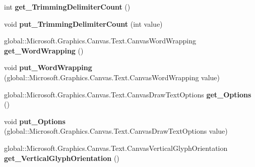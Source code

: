 \begin{DoxyCompactItemize}
int {\bfseries get\+\_\+\+Trimming\+Delimiter\+Count} ()
\item 
\mbox{\label{class_microsoft_1_1_graphics_1_1_canvas_1_1_text_1_1_canvas_text_format_a5b0a73ce4c824439d5e199f8b61aa1ea}} 
void {\bfseries put\+\_\+\+Trimming\+Delimiter\+Count} (int value)
\item 
\mbox{\label{class_microsoft_1_1_graphics_1_1_canvas_1_1_text_1_1_canvas_text_format_abb2706795b70c24892b6368e51d9920d}} 
global\+::\+Microsoft.\+Graphics.\+Canvas.\+Text.\+Canvas\+Word\+Wrapping {\bfseries get\+\_\+\+Word\+Wrapping} ()
\item 
\mbox{\label{class_microsoft_1_1_graphics_1_1_canvas_1_1_text_1_1_canvas_text_format_a0ca952d56c80bf6bcf1f90158f9900be}} 
void {\bfseries put\+\_\+\+Word\+Wrapping} (global\+::\+Microsoft.\+Graphics.\+Canvas.\+Text.\+Canvas\+Word\+Wrapping value)
\item 
\mbox{\label{class_microsoft_1_1_graphics_1_1_canvas_1_1_text_1_1_canvas_text_format_af5d308c3a1f87b675c1b52eff7c0148c}} 
global\+::\+Microsoft.\+Graphics.\+Canvas.\+Text.\+Canvas\+Draw\+Text\+Options {\bfseries get\+\_\+\+Options} ()
\item 
\mbox{\label{class_microsoft_1_1_graphics_1_1_canvas_1_1_text_1_1_canvas_text_format_a2cb2c8c70a2db084b058574b75fbe1fb}} 
void {\bfseries put\+\_\+\+Options} (global\+::\+Microsoft.\+Graphics.\+Canvas.\+Text.\+Canvas\+Draw\+Text\+Options value)
\item 
\mbox{\label{class_microsoft_1_1_graphics_1_1_canvas_1_1_text_1_1_canvas_text_format_ac501273bff089574992daf9dd1c47eb8}} 
global\+::\+Microsoft.\+Graphics.\+Canvas.\+Text.\+Canvas\+Vertical\+Glyph\+Orientation {\bfseries get\+\_\+\+Vertical\+Glyph\+Orientation} ()
\item 
\mbox{\label{class_microsoft_1_1_graphics_1_1_canvas_1_1_text_1_1_canvas_text_format_a78bb0a96f5140c39fdae9d2808bd58a0}} 

\end{DoxyCompactItemize}
